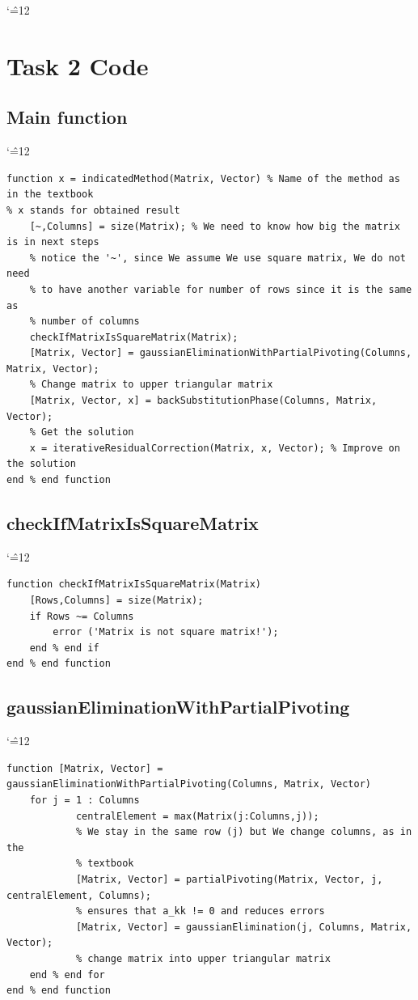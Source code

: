 \documentclass[12pt]{report}
\newenvironment{simplechar}{%
   \catcode`\^=12
}{}
\begin{document}
\begin{simplechar}
\newpage
\section{Task 2 Code}
\subsection{Main function}
\begin{simplechar}
\begin{lstlisting}
function x = indicatedMethod(Matrix, Vector) % Name of the method as in the textbook
% x stands for obtained result
    [~,Columns] = size(Matrix); % We need to know how big the matrix is in next steps
    % notice the '~', since We assume We use square matrix, We do not need
    % to have another variable for number of rows since it is the same as
    % number of columns
    checkIfMatrixIsSquareMatrix(Matrix);
    [Matrix, Vector] = gaussianEliminationWithPartialPivoting(Columns, Matrix, Vector);
    % Change matrix to upper triangular matrix
    [Matrix, Vector, x] = backSubstitutionPhase(Columns, Matrix, Vector);
    % Get the solution
    x = iterativeResidualCorrection(Matrix, x, Vector); % Improve on the solution
end % end function
\end{lstlisting}
\end{simplechar}

\subsection{checkIfMatrixIsSquareMatrix}
\begin{simplechar}
\begin{lstlisting}
function checkIfMatrixIsSquareMatrix(Matrix)
    [Rows,Columns] = size(Matrix);
    if Rows ~= Columns
        error ('Matrix is not square matrix!');
    end % end if
end % end function
\end{lstlisting}
\end{simplechar}

\newpage
\subsection{gaussianEliminationWithPartialPivoting}
\begin{simplechar}
\begin{lstlisting}
function [Matrix, Vector] = gaussianEliminationWithPartialPivoting(Columns, Matrix, Vector)
    for j = 1 : Columns
            centralElement = max(Matrix(j:Columns,j));
            % We stay in the same row (j) but We change columns, as in the
            % textbook
            [Matrix, Vector] = partialPivoting(Matrix, Vector, j, centralElement, Columns);
            % ensures that a_kk != 0 and reduces errors
            [Matrix, Vector] = gaussianElimination(j, Columns, Matrix, Vector);
            % change matrix into upper triangular matrix
    end % end for
end % end function
\end{lstlisting}
\end{simplechar}


\end{simplechar}
\end{document}
